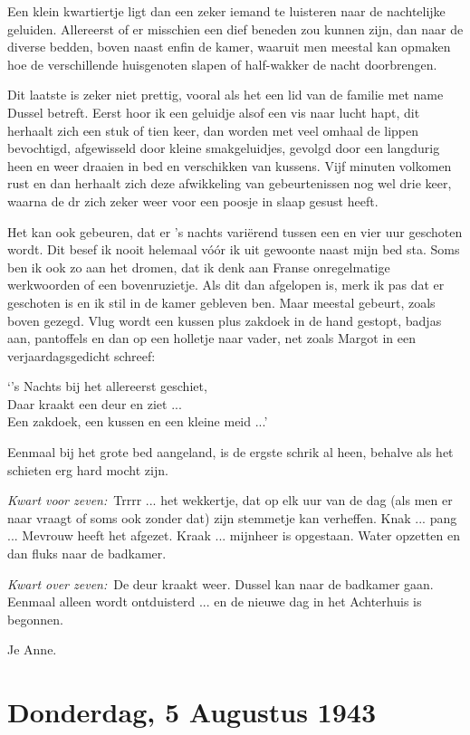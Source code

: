 \documentclass{book}
\begin{document}
Een klein kwartiertje ligt dan een zeker iemand te luisteren naar de nachtelijke
geluiden. Allereerst of er misschien een dief beneden zou kunnen zijn, dan naar
de diverse bedden, boven naast enfin de kamer, waaruit men meestal kan opmaken
hoe de verschillende huisgenoten slapen of half-wakker de nacht doorbrengen.

Dit laatste is zeker niet prettig, vooral als het een lid van de familie met
name Dussel betreft. Eerst hoor ik een geluidje alsof een vis naar lucht hapt,
dit herhaalt zich een stuk of tien keer, dan worden met veel omhaal de lippen
bevochtigd, afgewisseld door kleine smakgeluidjes, gevolgd door een langdurig
heen en weer draaien in bed en verschikken van kussens. Vijf minuten volkomen
rust en dan herhaalt zich deze afwikkeling van gebeurtenissen nog wel drie keer,
waarna de dr zich zeker weer voor een poosje in slaap gesust heeft.

Het kan ook gebeuren, dat er 's nachts variërend tussen een en vier uur
geschoten wordt. Dit besef ik nooit helemaal vóór ik uit gewoonte naast mijn bed
sta. Soms ben ik ook zo aan het dromen, dat ik denk aan Franse onregelmatige
werkwoorden of een bovenruzietje. Als dit dan afgelopen is, merk ik pas dat er
geschoten is en ik stil in de kamer gebleven ben.  Maar meestal gebeurt, zoals
boven gezegd. Vlug wordt een kussen plus zakdoek in de hand gestopt, badjas aan,
pantoffels en dan op een holletje naar vader, net zoals Margot in een
verjaardagsgedicht schreef:

`'s Nachts bij het allereerst geschiet,\\
Daar kraakt een deur en ziet ...\\
Een
zakdoek, een kussen en een kleine meid ...'

Eenmaal bij het grote bed aangeland, is de ergste schrik al heen, behalve als
het schieten erg hard mocht zijn.

\emph{Kwart voor zeven:}~Trrrr ... het wekkertje, dat op elk uur van de dag (als
men er naar vraagt of soms ook zonder dat) zijn stemmetje kan verheffen. Knak
... pang ... Mevrouw heeft het afgezet. Kraak ...  mijnheer is opgestaan. Water
opzetten en dan fluks naar de badkamer.

\emph{Kwart over zeven:}~De deur kraakt weer. Dussel kan naar de badkamer gaan.
Eenmaal alleen wordt ontduisterd ... en de nieuwe dag in het Achterhuis is
begonnen.

Je Anne.

\section*{Donderdag, 5 Augustus 1943}
\end{document}
